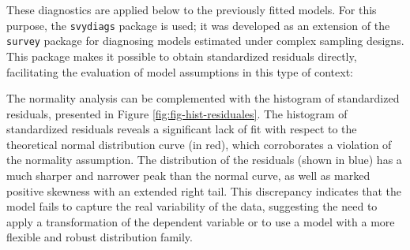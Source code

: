 \documentclass[
  english,
  12pt,
]{book}
\newenvironment{Shaded}{\begin{snugshade}}{\end{snugshade}}
\newcommand{\AttributeTok}[1]{\textcolor[rgb]{0.13,0.29,0.53}{#1}}
\newcommand{\DecValTok}[1]{\textcolor[rgb]{0.00,0.00,0.81}{#1}}
\newcommand{\FloatTok}[1]{\textcolor[rgb]{0.00,0.00,0.81}{#1}}
\newcommand{\FunctionTok}[1]{\textcolor[rgb]{0.13,0.29,0.53}{\textbf{#1}}}
\newcommand{\NormalTok}[1]{#1}
\newcommand{\OtherTok}[1]{\textcolor[rgb]{0.56,0.35,0.01}{#1}}
\newcommand{\SpecialCharTok}[1]{\textcolor[rgb]{0.81,0.36,0.00}{\textbf{#1}}}
\newcommand{\StringTok}[1]{\textcolor[rgb]{0.31,0.60,0.02}{#1}}
\begin{document}
These diagnostics are applied below to the previously fitted models. For this purpose, the \texttt{svydiags} package \citep{Valliant2024} is used; it was developed as an extension of the \texttt{survey} package for diagnosing models estimated under complex sampling designs. This package makes it possible to obtain standardized residuals directly, facilitating the evaluation of model assumptions in this type of context:

\begin{Shaded}
\end{Shaded}

The normality analysis can be complemented with the histogram of standardized residuals, presented in Figure \ref{fig:fig-hist-residuales}. The histogram of standardized residuals reveals a significant lack of fit with respect to the theoretical normal distribution curve (in red), which corroborates a violation of the normality assumption. The distribution of the residuals (shown in blue) has a much sharper and narrower peak than the normal curve, as well as marked positive skewness with an extended right tail. This discrepancy indicates that the model fails to capture the real variability of the data, suggesting the need to apply a transformation of the dependent variable or to use a model with a more flexible and robust distribution family.

\begin{Shaded}
\end{Shaded}
\end{document}
